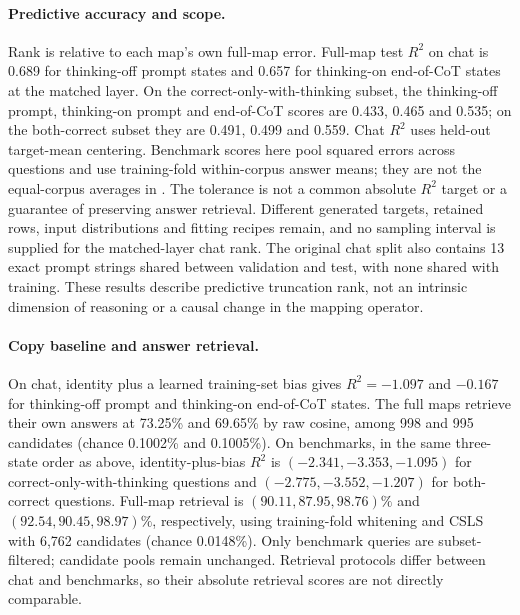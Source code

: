 \paragraph{Predictive accuracy and scope.}
Rank is relative to each map's own full-map error. Full-map test $R^2$ on chat
is 0.689 for thinking-off prompt states and 0.657 for thinking-on end-of-CoT
states at the matched layer. On the correct-only-with-thinking subset, the
thinking-off prompt, thinking-on prompt and end-of-CoT scores are 0.433, 0.465
and 0.535; on the both-correct subset they are 0.491, 0.499 and 0.559.
Chat $R^2$ uses held-out target-mean centering. Benchmark scores here pool squared
errors across questions and use training-fold within-corpus answer means;
they are not the equal-corpus averages in .
The tolerance is not a common absolute $R^2$ target or a guarantee of preserving
answer retrieval. Different generated targets, retained rows, input
distributions and fitting recipes remain, and no sampling interval is supplied
for the matched-layer chat rank. The original chat split also contains 13 exact
prompt strings shared between validation and test, with none shared with training.
These results describe predictive truncation
rank, not an intrinsic dimension of reasoning or a causal change in the mapping
operator.

\paragraph{Copy baseline and answer retrieval.}
On chat, identity plus a learned training-set bias gives $R^2=-1.097$ and
$-0.167$ for thinking-off prompt and thinking-on end-of-CoT states. The full
maps retrieve their own answers at 73.25\% and 69.65\% by raw cosine, among
998 and 995 candidates (chance 0.1002\% and 0.1005\%). On benchmarks, in the
same three-state order as above, identity-plus-bias $R^2$ is
$(-2.341,-3.353,-1.095)$ for correct-only-with-thinking questions and
$(-2.775,-3.552,-1.207)$ for both-correct questions. Full-map retrieval is
$(90.11,87.95,98.76)\%$ and $(92.54,90.45,98.97)\%$, respectively, using
training-fold whitening and CSLS with 6,762 candidates (chance 0.0148\%).
Only benchmark queries are subset-filtered; candidate pools remain unchanged.
Retrieval protocols differ between chat and benchmarks, so their absolute
retrieval scores are not directly comparable.

